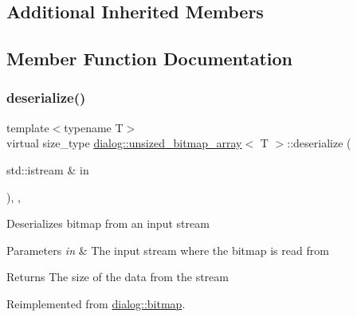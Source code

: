 \subsection*{Additional Inherited Members}


\subsection{Member Function Documentation}
\mbox{\label{classdialog_1_1unsized__bitmap__array_a4ae9d743033be4468f4c0be8dbaccbca}} 
\subsubsection{\texorpdfstring{deserialize()}{deserialize()}}
{\footnotesize\ttfamily template$<$typename T$>$ \\
virtual size\+\_\+type \hyperlink{classdialog_1_1unsized__bitmap__array}{dialog\+::unsized\+\_\+bitmap\+\_\+array}$<$ T $>$\+::deserialize (\begin{DoxyParamCaption}\item[{std\+::istream \&}]{in }\end{DoxyParamCaption})\hspace{0.3cm}{\ttfamily [inline]}, {\ttfamily [override]}, {\ttfamily [virtual]}}

Deserializes bitmap from an input stream 
\begin{DoxyParams}{Parameters}
{\em in} & The input stream where the bitmap is read from \\
\hline
\end{DoxyParams}
\begin{DoxyReturn}{Returns}
The size of the data from the stream 
\end{DoxyReturn}


Reimplemented from \hyperlink{classdialog_1_1bitmap_a5c4c9a790b785bbc021d913a53cffe80}{dialog\+::bitmap}.

\mbox{\label{classdialog_1_1unsized__bitmap__array_a3c6dfec187c0ecad49d562c2b081ec6a}} 
